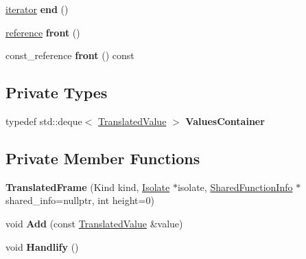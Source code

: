 \begin{DoxyCompactItemize}
\item 
\hyperlink{classv8_1_1internal_1_1_translated_frame_1_1iterator}{iterator} {\bfseries end} ()\hypertarget{classv8_1_1internal_1_1_translated_frame_a045d000f672509ec860ed19e309ec800}{}\label{classv8_1_1internal_1_1_translated_frame_a045d000f672509ec860ed19e309ec800}

\item 
\hyperlink{classv8_1_1internal_1_1_translated_value}{reference} {\bfseries front} ()\hypertarget{classv8_1_1internal_1_1_translated_frame_a10dbd5e39f866cfebdd40ec9afd15ec6}{}\label{classv8_1_1internal_1_1_translated_frame_a10dbd5e39f866cfebdd40ec9afd15ec6}

\item 
const\+\_\+reference {\bfseries front} () const \hypertarget{classv8_1_1internal_1_1_translated_frame_ad92e7e59ff48aeb99159f7f12bd80976}{}\label{classv8_1_1internal_1_1_translated_frame_ad92e7e59ff48aeb99159f7f12bd80976}

\end{DoxyCompactItemize}
\subsection*{Private Types}
\begin{DoxyCompactItemize}
\item 
typedef std\+::deque$<$ \hyperlink{classv8_1_1internal_1_1_translated_value}{Translated\+Value} $>$ {\bfseries Values\+Container}\hypertarget{classv8_1_1internal_1_1_translated_frame_ad59c375ca68658dc394e10c9117e2430}{}\label{classv8_1_1internal_1_1_translated_frame_ad59c375ca68658dc394e10c9117e2430}

\end{DoxyCompactItemize}
\subsection*{Private Member Functions}
\begin{DoxyCompactItemize}
\item 
{\bfseries Translated\+Frame} (Kind kind, \hyperlink{classv8_1_1internal_1_1_isolate}{Isolate} $\ast$isolate, \hyperlink{classv8_1_1internal_1_1_shared_function_info}{Shared\+Function\+Info} $\ast$shared\+\_\+info=nullptr, int height=0)\hypertarget{classv8_1_1internal_1_1_translated_frame_af90a7c22f46c7224b3686f0ad73a4e5b}{}\label{classv8_1_1internal_1_1_translated_frame_af90a7c22f46c7224b3686f0ad73a4e5b}

\item 
void {\bfseries Add} (const \hyperlink{classv8_1_1internal_1_1_translated_value}{Translated\+Value} \&value)\hypertarget{classv8_1_1internal_1_1_translated_frame_a441977f16d6e055336c34f6b6235a5a4}{}\label{classv8_1_1internal_1_1_translated_frame_a441977f16d6e055336c34f6b6235a5a4}

\item 
void {\bfseries Handlify} ()\hypertarget{classv8_1_1internal_1_1_translated_frame_a380d7cc3b1111e48ad911289d3072e18}{}\label{classv8_1_1internal_1_1_translated_frame_a380d7cc3b1111e48ad911289d3072e18}

\end{DoxyCompactItemize}
